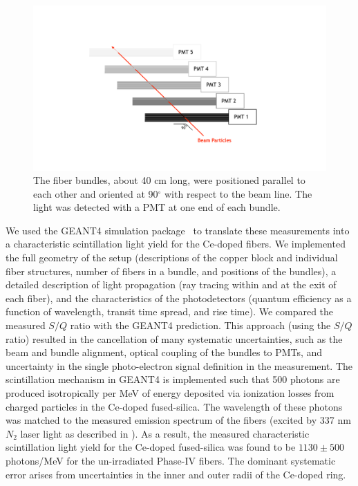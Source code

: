 \documentclass[a4paper,11pt]{article}
\begin{document}
\begin{figure}[ht]
\begin{center}\vspace{-1pc}
      \includegraphics[width=12cm]{Figures/FiberBundles.pdf}
\caption{\small The fiber bundles, about 40 cm long, were positioned parallel to each other and oriented at 90$^\circ$ with respect to the beam line. The light was detected with a PMT at one end of each bundle.}
    \label{fig:bundles}
\end{center}
\end{figure}

We used the GEANT4 simulation package~\cite{r-GEANT4} to translate these measurements into a characteristic scintillation light yield for the Ce-doped fibers.  We implemented the full geometry of the setup (descriptions of the copper block and individual fiber structures, number of fibers in a bundle, and positions of the bundles), a detailed description of light propagation (ray tracing within and at the exit of each fiber), and the characteristics of the photodetectors (quantum efficiency as a function of wavelength, transit time spread, and rise time).  We compared the measured $S/Q$ ratio with the GEANT4 prediction.  This approach (using the $S/Q$ ratio) resulted in the cancellation of many systematic uncertainties, such as the beam and bundle alignment, optical coupling of the bundles to PMTs, and uncertainty in the single photo-electron signal definition in the measurement.  The scintillation mechanism in GEANT4 is implemented such that 500 photons are produced isotropically per MeV of energy deposited via ionization losses from charged particles in the Ce-doped fused-silica. The wavelength of these photons was  matched to the measured emission spectrum of the fibers (excited by 337 nm $N_2$ laser light as described in \cite{JINSTPaper2}).  As a result, the measured characteristic scintillation light yield for the Ce-doped fused-silica was found to be $1130\pm 500$ photons/MeV for the un-irradiated Phase-IV fibers. The dominant systematic error arises from uncertainties in the inner and outer radii of the Ce-doped ring. 
\end{document}
